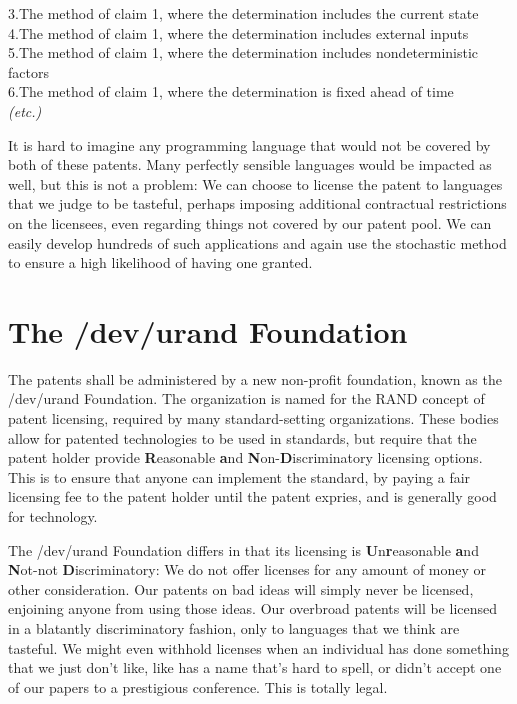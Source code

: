 \documentclass[acmtocl]%
{boviktrans}
\begin{document}
3.\quad The method of claim 1, where the determination includes the current state \\

4.\quad The method of claim 1, where the determination includes external inputs \\

5.\quad The method of claim 1, where the determination includes nondeterministic factors \\

6.\quad The method of claim 1, where the determination is fixed ahead of time \\

{\it (etc.)}

It is hard to imagine any programming language that would not be
covered by both of these patents. Many perfectly sensible languages
would be impacted as well, but this is not a problem: We can choose to
license the patent to languages that we judge to be tasteful, perhaps
imposing additional contractual restrictions on the licensees, even
regarding things not covered by our patent pool. We can easily
develop hundreds of such applications and again use the stochastic
method to ensure a high likelihood of having one granted.

\section{The /dev/urand Foundation}

The patents shall be administered by a new non-profit foundation,
known as the /dev/urand Foundation. The organization is named for the
RAND concept of patent licensing, required by many standard-setting
organizations. These bodies allow for patented technologies to be used
in standards, but require that the patent holder provide {\bf
  R}easonable {\bf a}nd {\bf N}on-{\bf D}iscriminatory licensing
options. This is to ensure that anyone can implement the standard, by
paying a fair licensing fee to the patent holder until the patent
expries, and is generally good for technology.

The /dev/urand Foundation differs in that its licensing is {\bf
  U}n{\bf r}easonable {\bf a}nd {\bf N}ot-not {\bf D}iscriminatory: We
do not offer licenses for any amount of money or other consideration.
Our patents on bad ideas will simply never be licensed, enjoining
anyone from using those ideas. Our overbroad patents will be licensed
in a blatantly discriminatory fashion, only to languages that we think
are tasteful. We might even withhold licenses when an individual has
done something that we just don't like, like has a name that's hard to
spell, or didn't accept one of our papers to a prestigious
conference. This is totally legal.
\end{document}
